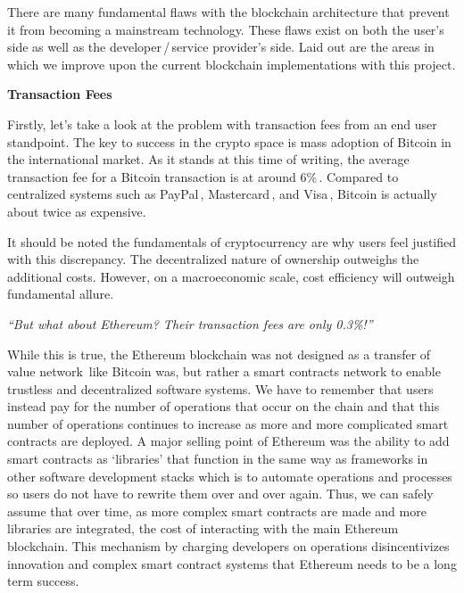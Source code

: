 \documentclass{%
	article}
\begin{document}
There are many fundamental flaws with the blockchain architecture that prevent it from becoming a mainstream technology. These flaws exist on both the user’s side as well as the developer\,/\,service provider’s side. Laid out are the areas in which we improve upon the current blockchain implementations with this project.

\begin{center}
\textbf{Transaction Fees}
\end{center}

Firstly, let’s take a look at the problem with transaction fees from an end user standpoint. The key to success in the crypto space is mass adoption of Bitcoin in the international market. As it stands at this time of writing, the average transaction fee for a Bitcoin transaction is at around 6\%\,\cite{bitcoinfees}. Compared to centralized systems such as PayPal\,\cite{paypalfees}, Mastercard\,\cite{mastercardfees}, and Visa\,\cite{visafees}, Bitcoin is actually about twice as expensive.

It should be noted the fundamentals of cryptocurrency are why users feel justified with this discrepancy. The decentralized nature of ownership outweighs the additional costs. However, on a macroeconomic scale, cost efficiency will outweigh fundamental allure.

\begin{center}
\textit{“But what about Ethereum? Their transaction fees are only 0.3\%!”}
\end{center}
	
While this is true, the Ethereum blockchain was not designed as a transfer of value network\,\cite{ethereumwp} like Bitcoin was, but rather a smart contracts network to enable trustless and decentralized software systems. We have to remember that users instead pay for the number of operations that occur on the chain and that this number of operations continues to increase as more and more complicated smart contracts are deployed. A major selling point of Ethereum was the ability to add smart contracts as ‘libraries’ that function in the same way as frameworks in other software development stacks which is to automate operations and processes so users do not have to rewrite them over and over again. Thus, we can safely assume that over time, as more complex smart contracts are made and more libraries are integrated, the cost of interacting with the main Ethereum blockchain. This mechanism by charging developers on operations disincentivizes innovation and complex smart contract systems that Ethereum needs to be a long term success.
\end{document}
